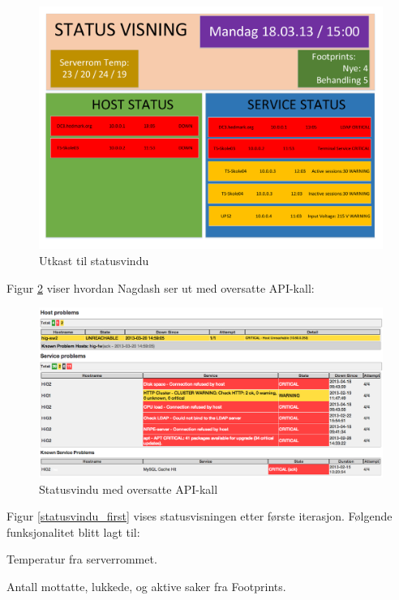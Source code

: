 \begin{figure}[H]
    \centering
    \includegraphics[scale=0.3]{img/statusvindu_mockup}
    \caption{Utkast til statusvindu}
    \label{statusvindu_utkast}
\end{figure}

Figur \ref{statusvindu_oversatte_kall} viser hvordan Nagdash ser ut med oversatte API-kall:
\begin{figure}[H]
    \centering
    \includegraphics[scale=0.3]{img/statusvindu_oversatte_kall}
    \caption{Statusvindu med oversatte API-kall}
    \label{statusvindu_oversatte_kall}
\end{figure}

Figur \ref{statusvindu_first} vises statusvisningen etter første iterasjon. Følgende funksjonalitet blitt lagt til:
\begin{itemize*}
	\item Temperatur fra serverrommet.
	\item Antall mottatte, lukkede, og aktive saker fra Footprints.
\end{itemize*}

